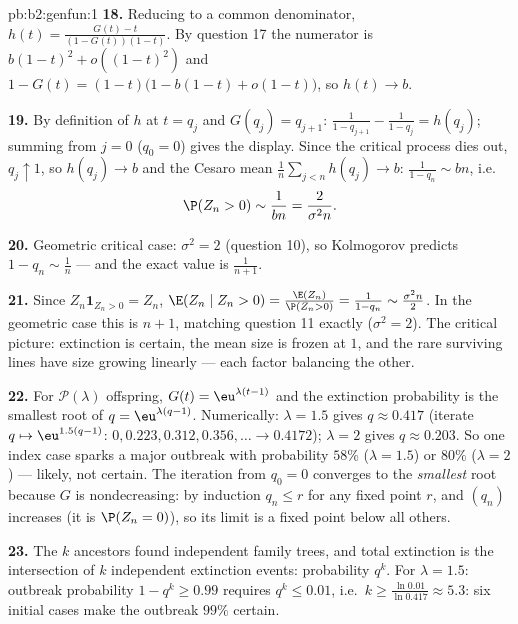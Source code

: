 \begin{solution}{pb:b2:genfun:1}
\textbf{18.} Reducing to a common denominator, $h(t) =
\frac{G(t) - t}{(1 - G(t))(1 - t)}$. By question 17 the
numerator is $b(1-t)^2 + o((1-t)^2)$ and $1 - G(t) = (1 -
t)\bigl(1 - b(1-t) + o(1-t)\bigr)$, so $h(t) \to b$.

\textbf{19.} By definition of $h$ at $t = q_j$ and $G(q_j) =
q_{j+1}$: $\frac1{1 - q_{j+1}} - \frac1{1-q_j} = h(q_j)$;
summing from $j = 0$ ($q_0 = 0$) gives the display. Since the
critical process dies out, $q_j \uparrow 1$, so $h(q_j) \to
b$ and the Cesaro mean $\frac1n\sum_{j<n}h(q_j) \to b$:
$\frac1{1-q_n} \sim bn$, i.e.
\[
\P(Z_n > 0) \sim \frac1{bn} = \frac{2}{\sigma^2 n} .
\]

\textbf{20.} Geometric critical case: $\sigma^2 = 2$
(question 10), so Kolmogorov predicts $1 - q_n \sim \frac1n$
--- and the exact value is $\frac1{n+1}$.

\textbf{21.} Since $Z_n\mathbf 1_{Z_n > 0} = Z_n$, $\E(Z_n
\mid Z_n > 0) = \frac{\E(Z_n)}{\P(Z_n > 0)} = \frac1{1 -
q_n} \sim \frac{\sigma^2n}2$. In the geometric case this is
$n + 1$, matching question 11 exactly ($\sigma^2 = 2$). The
critical picture: extinction is certain, the mean size is
frozen at $1$, and the rare surviving lines have size growing
linearly --- each factor balancing the other.

\textbf{22.} For $\mathcal P(\lambda)$ offspring, $G(t) =
\eu^{\lambda(t-1)}$ and the extinction probability is the
smallest root of $q = \eu^{\lambda(q-1)}$. Numerically:
$\lambda = 1.5$ gives $q \approx 0.417$ (iterate $q \mapsto
\eu^{1.5(q-1)}$: $0, 0.223, 0.312, 0.356, \dots \to 0.4172$);
$\lambda = 2$ gives $q \approx 0.203$. So one index case
sparks a major outbreak with probability $58\%$
($\lambda = 1.5$) or $80\%$ ($\lambda = 2$) --- likely, not
certain. The iteration from $q_0 = 0$ converges to the
\emph{smallest} root because $G$ is nondecreasing: by
induction $q_n \leq r$ for any fixed point $r$, and $(q_n)$
increases (it is $\P(Z_n = 0)$), so its limit is a fixed
point below all others.

\textbf{23.} The $k$ ancestors found independent family
trees, and total extinction is the intersection of $k$
independent extinction events: probability $q^k$. For
$\lambda = 1.5$: outbreak probability $1 - q^k \geq 0.99$
requires $q^k \leq 0.01$, i.e.\ $k \geq
\frac{\ln 0.01}{\ln 0.417} \approx 5.3$: six initial cases
make the outbreak $99\%$ certain.


\end{solution}
